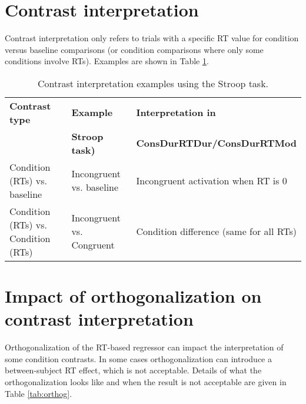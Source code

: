 \documentclass[sn-mathphys,Numbered, super]{sn-jnl}
\begin{document}
\section{Contrast interpretation}

Contrast interpretation only refers to trials with a specific RT value for condition versus baseline comparisons (or condition comparisons where only some conditions involve RTs).  Examples are shown in Table \ref{tab:contrast-descriptions}.


\begin{table}[ht!]
\caption{Contrast interpretation examples using the Stroop task.}\label{tab:contrast-descriptions}
  \begin{tabular}{p{1.2in}p{1.4in}p{2in}}
  \toprule
     \textbf{Contrast type} & \textbf{Example}    & \textbf{Interpretation in} \\ 
        & \textbf{Stroop task)} & \textbf{ConsDurRTDur/ConsDurRTMod} \\
   \toprule
     Condition (RTs) vs. \newline baseline & Incongruent  vs. baseline & Incongruent activation when RT is 0 \\ 
     Condition (RTs) vs. \newline Condition (RTs) & Incongruent vs. Congruent & Condition difference \newline (same for all RTs) \\ 
     \bottomrule
   \end{tabular}
\end{table}


\newpage
\section{Impact of orthogonalization on contrast interpretation}

Orthogonalization of the RT-based regressor can impact the interpretation of some condition contrasts.  In some cases orthogonalization can introduce a between-subject RT effect, which is not acceptable.  Details of what the orthogonalization looks like and when the result is not acceptable are given in Table \ref{tab:orthog}.
\end{document}
